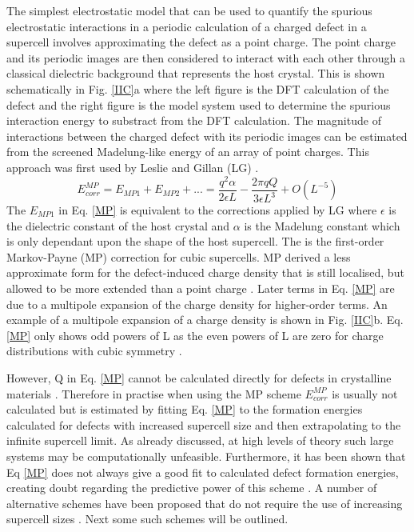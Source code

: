 \documentclass[11pt, twoside]{report}
\begin{document}
The simplest electrostatic model that can be used to quantify the spurious electrostatic interactions in a periodic calculation of a charged defect in a supercell involves approximating the defect as a point charge. The point charge and its periodic images are then considered to interact with each other through a classical dielectric background that represents the host crystal. This is shown schematically in Fig. \ref{IIC}a where the left figure is the DFT calculation of the defect and the right figure is the model system used to determine the spurious interaction energy to substract from the DFT calculation. The magnitude of interactions between the charged defect with its periodic images can be estimated from the screened Madelung-like energy of an array of point charges. This approach was first used by Leslie and Gillan (LG) \cite{LeslieGillan}. 
\begin{equation}\label{MP}
E^{MP}_{corr} = E_{MP1} + E_{MP2} + ... = \frac{q^2\alpha}{2 \epsilon L} - \frac{2 \pi q Q}{3 \epsilon L^3} + O(L^{-5})
\end{equation}
The $E_{MP1}$ in Eq. \ref{MP} is equivalent to the corrections applied by LG where $\epsilon$ is the dielectric constant of the host crystal and $\alpha$ is the Madelung constant which is only dependant upon the shape of the host supercell. The is the first-order Markov-Payne (MP) correction for cubic supercells.
MP derived a less approximate form for the defect-induced charge density that is still localised, but allowed to be more extended than a point charge \cite{MP}. Later terms in Eq. \ref{MP} are due to a multipole expansion of the charge density for higher-order terms. An example of a multipole expansion of a charge density is shown in Fig. \ref{IIC}b. Eq. \ref{MP} only shows odd powers of L as the even powers of L are zero for charge distributions with cubic symmetry \cite{Durrant_defects}.

However, Q in Eq. \ref{MP} cannot be calculated directly for defects in crystalline materials \cite{Lany_defects_2008}. Therefore in practise when using the MP scheme $E^{MP}_{corr}$ is usually not calculated but is estimated by fitting Eq. \ref{MP} to the formation energies calculated for defects with increased supercell size and then extrapolating to the infinite supercell limit. As already discussed, at high levels of theory such large systems may be computationally unfeasible. Furthermore, it has been shown that Eq \ref{MP} does not always give a good fit to calculated defect formation energies, creating doubt regarding the predictive power of this scheme \cite{FNV}. A number of alternative schemes have been proposed that do not require the use of increasing supercell sizes \cite{MP, LeslieGillan, PeterSchultz, Lany_defects, FNV, kumagai_oba}. Next some such schemes will be outlined. 
\end{document}
